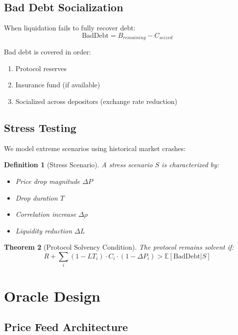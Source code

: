 \documentclass[11pt,a4paper]{article}
\newtheorem{theorem}{Theorem}
\newtheorem{definition}[theorem]{Definition}
\begin{document}
\subsection{Bad Debt Socialization}

When liquidation fails to fully recover debt:
\begin{equation}
    \text{BadDebt} = B_{remaining} - C_{seized}
\end{equation}

Bad debt is covered in order:
\begin{enumerate}
    \item Protocol reserves
    \item Insurance fund (if available)
    \item Socialized across depositors (exchange rate reduction)
\end{enumerate}

\subsection{Stress Testing}

We model extreme scenarios using historical market crashes:

\begin{definition}[Stress Scenario]
A stress scenario $S$ is characterized by:
\begin{itemize}
    \item Price drop magnitude $\Delta P$
    \item Drop duration $T$
    \item Correlation increase $\Delta \rho$
    \item Liquidity reduction $\Delta L$
\end{itemize}
\end{definition}

\begin{theorem}[Protocol Solvency Condition]
The protocol remains solvent if:
\begin{equation}
    R + \sum_i (1 - LT_i) \cdot C_i \cdot (1 - \Delta P_i) > \mathbb{E}[\text{BadDebt}|S]
\end{equation}
\end{theorem}

\section{Oracle Design}

\subsection{Price Feed Architecture}
\end{document}
